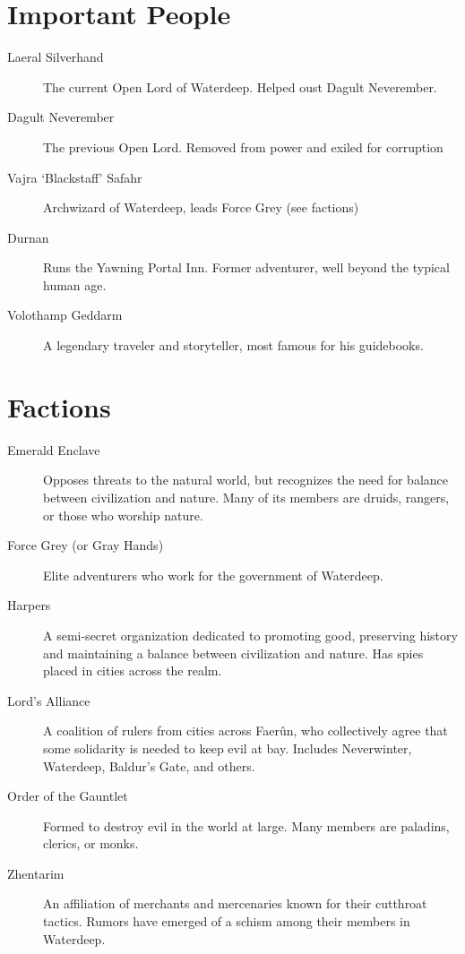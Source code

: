 \documentclass[10pt,twoside,twocolumn,openany,bg=print]{dndbook}
\begin{document}
\section{Important People}
\begin{description}
\item [Laeral Silverhand]
The current Open Lord of Waterdeep. Helped oust Dagult Neverember.
\item [Dagult Neverember]
The previous Open Lord. Removed from power and exiled for corruption
\item [Vajra ‘Blackstaff’ Safahr]
Archwizard of Waterdeep, leads Force Grey (see factions)
\item [Durnan]
Runs the Yawning Portal Inn. Former adventurer, well beyond the typical human age.
\item [Volothamp Geddarm]
A legendary traveler and storyteller, most famous for his guidebooks.
\end{description}

\section{Factions}
\begin{description}
\item [Emerald Enclave]
Opposes threats to the natural world, but recognizes the need for balance between civilization and nature. Many of its members are druids, rangers, or those who worship nature.
\item [Force Grey (or Gray Hands)]
Elite adventurers who work for the government of Waterdeep.
\item [Harpers]
A semi-secret organization dedicated to promoting good, preserving history and maintaining a balance between civilization and nature. Has spies placed in cities across the realm.
\item [Lord’s Alliance]
A coalition of rulers from cities across Faerûn, who collectively agree that some solidarity is needed to keep evil at bay. Includes Neverwinter, Waterdeep, Baldur’s Gate, and others.
\item [Order of the Gauntlet]
Formed to destroy evil in the world at large. Many members are paladins, clerics, or monks.
\item [Zhentarim]
An affiliation of merchants and mercenaries known for their cutthroat tactics. Rumors have emerged of a schism among their members in Waterdeep.
\end{description}

\onecolumn
\end{document}
